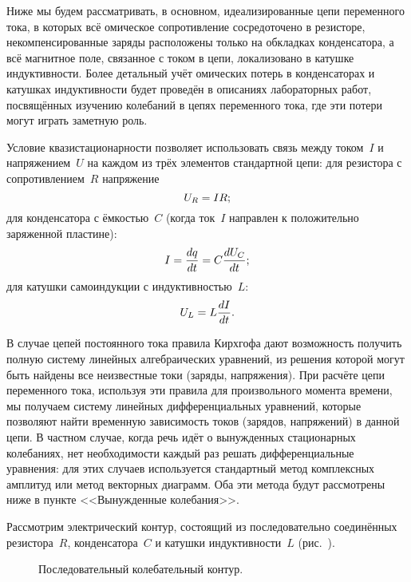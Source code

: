 Ниже мы будем рассматривать, в основном, идеализированные цепи переменного тока,
в которых всё омическое сопротивление сосредоточено в резисторе,
некомпенсированные заряды расположены только на обкладках конденсатора, а всё
магнитное поле, связанное с током в цепи, локализовано в катушке индуктивности.
Более детальный учёт омических потерь в конденсаторах и катушках индуктивности
будет проведён в описаниях лабораторных работ, посвящённых изучению колебаний в
цепях переменного тока, где эти потери могут играть заметную роль.

Условие квазистационарности позволяет использовать связь между током~$I$ и
напряжением~$U$ на каждом из трёх элементов стандартной цепи:
для резистора с сопротивлением~$R$ напряжение
\begin{equation}
	\eqmark{2.1}
	U_R=IR;
\end{equation}
для конденсатора с ёмкостью~$C$ (когда ток~$I$ направлен к положительно
заряженной пластине):
\begin{equation}
	\eqmark{2.2}
	I=\dfrac{dq}{dt}=C\dfrac{dU_C}{dt};
\end{equation}
для катушки самоиндукции с индуктивностью~$L$:
\begin{equation}
	\eqmark{2.3}
	U_L=L\dfrac{dI}{dt}.
\end{equation}

В случае цепей постоянного тока правила Кирхгофа дают возможность получить
полную систему линейных алгебраических уравнений, из решения которой могут быть
найдены все неизвестные токи (заряды, напряжения). При расчёте цепи переменного
тока, используя эти правила для произвольного момента времени, мы получаем
систему линейных дифференциальных уравнений, которые позволяют найти временную
зависимость токов (зарядов, напряжений) в данной цепи. В частном случае, когда
речь идёт о вынужденных стационарных колебаниях, нет необходимости каждый раз
решать дифференциальные уравнения: для этих случаев используется стандартный
метод комплексных амплитуд или метод векторных диаграмм. Оба эти метода будут
рассмотрены ниже в пункте <<Вынужденные колебания>>.


Рассмотрим электрический контур, состоящий из последовательно соединённых
резистора~$R$, конденсатора~$C$ и катушки индуктивности~$L$
(рис.~).

\begin{figure}[h!]
	\centering
	\caption{Последовательный колебательный контур.}
\end{figure}

